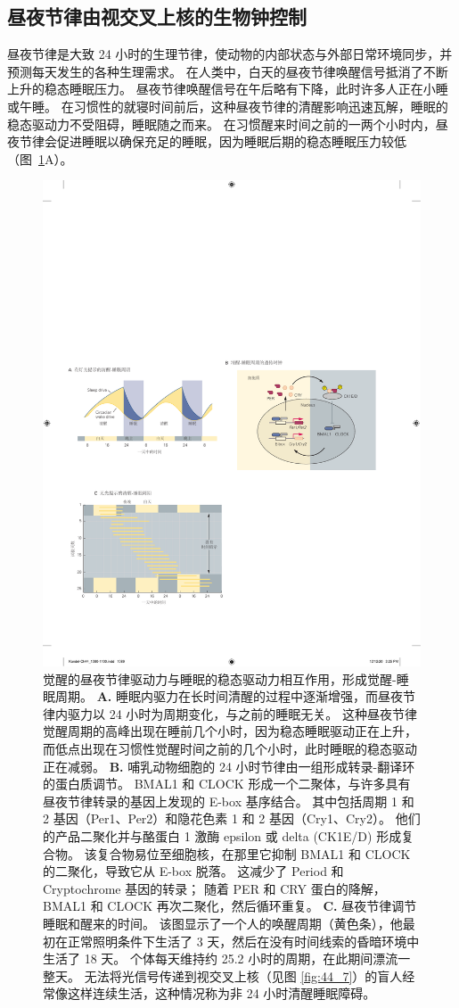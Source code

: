 \subsection{昼夜节律由视交叉上核的生物钟控制}

昼夜节律是大致 24 小时的生理节律，使动物的内部状态与外部日常环境同步，并预测每天发生的各种生理需求。
在人类中，白天的昼夜节律唤醒信号抵消了不断上升的稳态睡眠压力。
昼夜节律唤醒信号在午后略有下降，此时许多人正在小睡或午睡。
在习惯性的就寝时间前后，这种昼夜节律的清醒影响迅速瓦解，睡眠的稳态驱动力不受阻碍，睡眠随之而来。
在习惯醒来时间之前的一两个小时内，昼夜节律会促进睡眠以确保充足的睡眠，因为睡眠后期的稳态睡眠压力较低（图~\ref{fig:44_6}A）。


\begin{figure}[htbp]
	\centering
	\includegraphics[width=0.55\linewidth]{chap44/fig_44_6}
	\caption{觉醒的昼夜节律驱动力与睡眠的稳态驱动力相互作用，形成觉醒-睡眠周期。
		\textbf{A.} 睡眠内驱力在长时间清醒的过程中逐渐增强，而昼夜节律内驱力以 24 小时为周期变化，与之前的睡眠无关。
		这种昼夜节律觉醒周期的高峰出现在睡前几个小时，因为稳态睡眠驱动正在上升，而低点出现在习惯性觉醒时间之前的几个小时，此时睡眠的稳态驱动正在减弱。
		\textbf{B.} 哺乳动物细胞的 24 小时节律由一组形成转录-翻译环的蛋白质调节。
		BMAL1 和 CLOCK 形成一个二聚体，与许多具有昼夜节律转录的基因上发现的 E-box 基序结合。
		其中包括周期 1 和 2 基因（Per1、Per2）和隐花色素 1 和 2 基因（Cry1、Cry2）。
		他们的产品二聚化并与酪蛋白 1 激酶 epsilon 或 delta (CK1E/D) 形成复合物。
		该复合物易位至细胞核，在那里它抑制 BMAL1 和 CLOCK 的二聚化，导致它从 E-box 脱落。
		这减少了 Period 和 Cryptochrome 基因的转录；
		随着 PER 和 CRY 蛋白的降解，BMAL1 和 CLOCK 再次二聚化，然后循环重复。
		\textbf{C.} 昼夜节律调节睡眠和醒来的时间。
		该图显示了一个人的唤醒周期（黄色条），他最初在正常照明条件下生活了 3 天，然后在没有时间线索的昏暗环境中生活了 18 天。
		个体每天维持约 25.2 小时的周期，在此期间漂流一整天。
		无法将光信号传递到视交叉上核（见图 \ref{fig:44_7}）的盲人经常像这样连续生活，这种情况称为非 24 小时清醒睡眠障碍。}
	\label{fig:44_6}
\end{figure}


